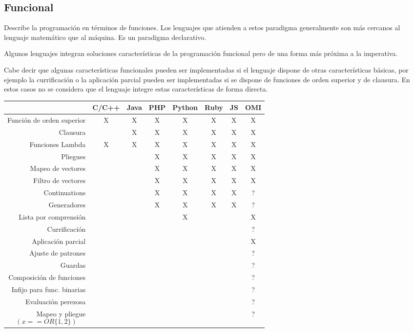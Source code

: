 \subsection {Funcional}
Describe la programación en términos de funciones. Los lenguajes que atienden a 
estos paradigma generalmente son más cercanos al lenguaje matemático que al máquina.
Es un paradigma declarativo. 

Algunos lenguajes integran soluciones características de la programación funcional pero de una forma más próxima a la imperativa.

Cabe decir que algunas características funcionales pueden ser implementadas 
si el lenguaje dispone de otras características básicas, 
por ejemplo la currificación o la aplicación parcial pueden 
ser implementadas si se dispone de funciones de orden superior y de clausura. En estos casos 
no se considera que el lenguaje integre estas características de forma directa.

\FloatBarrier
\begin{table}[h]
\begin{center}
\begin{tabular}{|r|c|c|c|c|c|c|c|} \hline
 & C/C++ & Java & PHP  & Python & Ruby & JS & OMI\\ \hline
Función de orden superior & X & X & X & X & X & X & X \\ \hline
Clausura  &  & X & X & X & X & X & X \\ \hline
Funciones Lambda  &X & X  & X & X & X & X & X \\ \hline
Pliegues & & & X & X & X & X & X \\ \hline
Mapeo de vectores & & & X & X & X & X & X \\ \hline
Filtro de vectores & & & X & X & X & X & X \\ \hline
Continuations &  &  & X & X & X & X & ? \\ \hline
Generadores & & & X & X & X & X & ? \\ \hline
Lista por comprensión & & &  & X & &  & X \\ \hline
Currificación  & & &  &  &  &  & ? \\ \hline
Aplicación parcial & & & & & & & X \\ \hline
Ajuste de patrones & & & & & & & ? \\ \hline
Guardas & & & & & & & ? \\ \hline
Composición de funciones & & & & & & & ? \\ \hline
Infijo para func. binarias & & & & & & & ? \\ \hline
Evaluación perezosa & & & & & & & ? \\ \hline
Mapeo y pliegue $$(x ==OR \{1,2\})$$ & & & & & & & ? \\ \hline
\end{tabular}
\end{center}
\end{table}
\FloatBarrier

